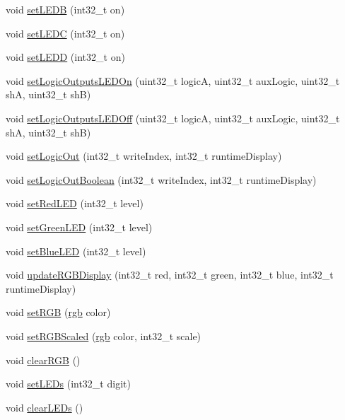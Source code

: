 \begin{DoxyCompactItemize}
void \mbox{\hyperlink{class_via_module_a26f8a7cb6d23f939d3dfcfae035d914e}{set\+L\+E\+DB}} (int32\+\_\+t on)
\item 
void \mbox{\hyperlink{class_via_module_a9b2a127bfdbf2240fbdd1f79bbef52bc}{set\+L\+E\+DC}} (int32\+\_\+t on)
\item 
void \mbox{\hyperlink{class_via_module_ad9883693e8eacafa7ee68866793adf6e}{set\+L\+E\+DD}} (int32\+\_\+t on)
\item 
void \mbox{\hyperlink{class_via_module_ad676ccf2b9177bccfc7842967a792fa1}{set\+Logic\+Outputs\+L\+E\+D\+On}} (uint32\+\_\+t logicA, uint32\+\_\+t aux\+Logic, uint32\+\_\+t shA, uint32\+\_\+t shB)
\item 
void \mbox{\hyperlink{class_via_module_ab7f3b8c185a7e46f6412753c9d17ead9}{set\+Logic\+Outputs\+L\+E\+D\+Off}} (uint32\+\_\+t logicA, uint32\+\_\+t aux\+Logic, uint32\+\_\+t shA, uint32\+\_\+t shB)
\item 
void \mbox{\hyperlink{class_via_module_a980dceea193632fc47c663dc2adcf7ca}{set\+Logic\+Out}} (int32\+\_\+t write\+Index, int32\+\_\+t runtime\+Display)
\item 
void \mbox{\hyperlink{class_via_module_ad7dd37cc52066d45418818743b3d23ad}{set\+Logic\+Out\+Boolean}} (int32\+\_\+t write\+Index, int32\+\_\+t runtime\+Display)
\item 
void \mbox{\hyperlink{class_via_module_a7a11c19ddf0c9a04061105a65d7c546b}{set\+Red\+L\+ED}} (int32\+\_\+t level)
\item 
void \mbox{\hyperlink{class_via_module_a4ead83d6ff1a8367d28d90c7e6271438}{set\+Green\+L\+ED}} (int32\+\_\+t level)
\item 
void \mbox{\hyperlink{class_via_module_a0832ffebe3e2d4d4cca044eaca59d99e}{set\+Blue\+L\+ED}} (int32\+\_\+t level)
\item 
void \mbox{\hyperlink{class_via_module_a4e627dab33ebf9b6ac2432aceb2a154d}{update\+R\+G\+B\+Display}} (int32\+\_\+t red, int32\+\_\+t green, int32\+\_\+t blue, int32\+\_\+t runtime\+Display)
\item 
void \mbox{\hyperlink{class_via_module_a9be28b96909b71625da532d5853c9ed4}{set\+R\+GB}} (\mbox{\hyperlink{structrgb}{rgb}} color)
\item 
void \mbox{\hyperlink{class_via_module_a284349df4c0e5b7153a5b82984fe9aee}{set\+R\+G\+B\+Scaled}} (\mbox{\hyperlink{structrgb}{rgb}} color, int32\+\_\+t scale)
\item 
void \mbox{\hyperlink{class_via_module_ab36185cb09e40578d0f0edb4ec74b7d3}{clear\+R\+GB}} ()
\item 
void \mbox{\hyperlink{class_via_module_a3acb105a42d49655361086d731d8e29d}{set\+L\+E\+Ds}} (int32\+\_\+t digit)
\item 
void \mbox{\hyperlink{class_via_module_ab690d8abdb4a3332db267d8d6a505bc7}{clear\+L\+E\+Ds}} ()
\end{DoxyCompactItemize}
